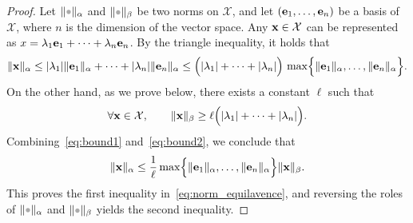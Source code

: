 \begin{proof}
    Let $\norm{\placeholder}_{\alpha}$ and $\norm{\placeholder}_{\beta}$ be two norms on $\mathcal X$,
    and let $(\mathbf e_1, \dotsc, \mathbf e_n)$ be a basis of $\mathcal X$,
    where $n$ is the dimension of the vector space.
    Any $\mathbf x \in \mathcal X$ can be represented as $x = \lambda_1 \mathbf e_1 + \dotsb + \lambda_n \mathbf e_n$.
    By the triangle inequality,
    it holds that
    \begin{equation}
        \label{eq:bound1}
        \lVert\mathbf x\rVert_{\alpha} \leq \lvert\lambda_1\rvert \lVert\mathbf e_1\rVert_{\alpha} + \dotsb + \lvert\lambda_n\rvert \lVert\mathbf e_n\rVert_{\alpha} \leq \Bigl(\lvert\lambda_1\rvert + \dotsb + \lvert\lambda_n\rvert\Bigr) \, \max \Bigl\{\lVert\mathbf e_1\rVert_{\alpha}, \dotsc, \lVert\mathbf e_n\rVert_{\alpha}\Bigr\}.
    \end{equation}
    On the other hand, as we prove below,
    there exists a constant $\ell$ such that
    \begin{equation}
        \label{eq:bound2}
        \forall \mathbf x \in \mathcal X, \qquad
        \lVert\mathbf x\rVert_{\beta}
        \geq \ell \Bigl( \lvert\lambda_1\rvert + \dotsb + \lvert\lambda_n\rvert \Bigr).
    \end{equation}
    Combining~\eqref{eq:bound1} and~\eqref{eq:bound2},
    we conclude that
    \[
        \lVert\mathbf x\rVert_{\alpha} \leq \frac{1}{\ell} \max \Bigl\{\lVert\mathbf e_1\rVert_{\alpha}, \dotsc, \lVert\mathbf e_n\rVert_{\alpha}\Bigr\} \lVert\mathbf x\rVert_{\beta}.
    \]
    This proves the first inequality in~\eqref{eq:norm_equilavence},
    and reversing the roles of $\norm{\placeholder}_{\alpha}$ and $\norm{\placeholder}_{\beta}$ yields the second inequality.


\end{proof}
